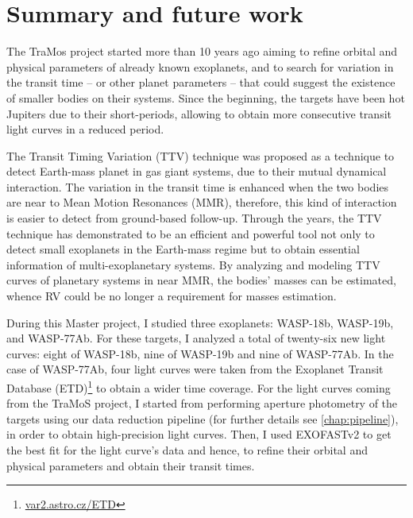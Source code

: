 \chapter{Summary and future work}\label{chap:conclusion}

The TraMos project started more than 10 years ago aiming to refine orbital and physical parameters of already known exoplanets, and to search for variation in the transit time -- or other planet parameters -- that could suggest the existence of smaller bodies on their systems. Since the beginning, the targets have been hot Jupiters due to their short-periods, allowing to obtain more consecutive transit light curves in a reduced period. 


The Transit Timing Variation (TTV) technique was proposed as a technique to detect Earth-mass planet in gas giant systems, due to their mutual dynamical interaction. The variation in the transit time is enhanced when the two bodies are near to Mean Motion Resonances (MMR), therefore, this kind of interaction is easier to detect from ground-based follow-up. Through the years, the TTV technique has demonstrated to be an efficient and powerful tool not only to detect small exoplanets in the Earth-mass regime but to obtain essential information of multi-exoplanetary systems. By analyzing and modeling TTV curves of planetary systems in near MMR, the bodies' masses can be estimated, whence RV could be no longer a requirement for masses estimation.

During this Master project, I studied three exoplanets: WASP-18b, WASP-19b, and WASP-77Ab. For these targets, I analyzed a total of twenty-six new light curves: eight of WASP-18b, nine of WASP-19b and nine of WASP-77Ab. In the case of WASP-77Ab, four light curves were taken from the Exoplanet Transit Database (ETD)\footnote{\url{var2.astro.cz/ETD}} to obtain a wider time coverage. For the light curves coming from the TraMoS project, I started from performing aperture photometry of the targets using our data reduction pipeline (for further details see \ref{chap:pipeline}), in order to obtain high-precision light curves. Then, I used EXOFASTv2 \cite{Eastman2013,Eastman2017} to get the best fit for the light curve's data and hence, to refine their orbital and physical parameters and obtain their transit times.

